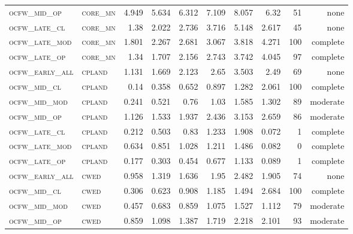 \begin{landscape}
\begin{center}
\begin{footnotesize}
\begin{longtable}{llrrrrr|rrr}
\textsc{ocfw\_mid\_op   } & \textsc{core\_mn  }    & 4.949    & 5.634    & 6.312    & 7.109    & 8.057    & 6.32     & 51  & none     \\
\textsc{ocfw\_late\_cl  } & \textsc{core\_mn  }    & 1.38     & 2.022    & 2.736    & 3.716    & 5.148    & 2.617    & 45  & none     \\
\textsc{ocfw\_late\_mod } & \textsc{core\_mn  }    & 1.801    & 2.267    & 2.681    & 3.067    & 3.818    & 4.271    & 100 & complete \\
\textsc{ocfw\_late\_op  } & \textsc{core\_mn  }    & 1.34     & 1.707    & 2.156    & 2.743    & 3.742    & 4.045    & 97  & complete \\
\textsc{ocfw\_early\_all} & \textsc{cpland    }    & 1.131    & 1.669    & 2.123    & 2.65     & 3.503    & 2.49     & 69  & none     \\
\textsc{ocfw\_mid\_cl   } & \textsc{cpland    }    & 0.14     & 0.358    & 0.652    & 0.897    & 1.282    & 2.061    & 100 & complete \\
\textsc{ocfw\_mid\_mod  } & \textsc{cpland    }    & 0.241    & 0.521    & 0.76     & 1.03     & 1.585    & 1.302    & 89  & moderate \\
\textsc{ocfw\_mid\_op   } & \textsc{cpland    }    & 1.126    & 1.533    & 1.937    & 2.436    & 3.153    & 2.659    & 86  & moderate \\
\textsc{ocfw\_late\_cl  } & \textsc{cpland    }    & 0.212    & 0.503    & 0.83     & 1.233    & 1.908    & 0.072    & 1   & complete \\
\textsc{ocfw\_late\_mod } & \textsc{cpland    }    & 0.634    & 0.851    & 1.028    & 1.211    & 1.486    & 0.082    & 0   & complete \\
\textsc{ocfw\_late\_op  } & \textsc{cpland    }    & 0.177    & 0.303    & 0.454    & 0.677    & 1.133    & 0.089    & 1   & complete \\
\textsc{ocfw\_early\_all} & \textsc{cwed      }    & 0.958    & 1.319    & 1.636    & 1.95     & 2.482    & 1.905    & 74  & none     \\
\textsc{ocfw\_mid\_cl   } & \textsc{cwed      }    & 0.306    & 0.623    & 0.908    & 1.185    & 1.494    & 2.684    & 100 & complete \\
\textsc{ocfw\_mid\_mod  } & \textsc{cwed      }    & 0.457    & 0.683    & 0.859    & 1.075    & 1.527    & 1.112    & 79  & moderate \\
\textsc{ocfw\_mid\_op   } & \textsc{cwed      }    & 0.859    & 1.098    & 1.387    & 1.719    & 2.218    & 2.101    & 93  & moderate \\

\end{longtable}
\end{footnotesize}
\end{center}
\end{landscape}
